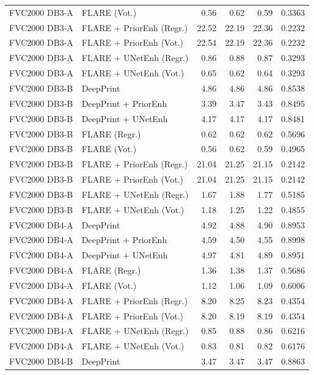 {\begin{longtable}{llrrrr}
FVC2000 DB3-A & FLARE (Vot.) & 0.56 & 0.62 & 0.59 & 0.3363 \\
FVC2000 DB3-A & FLARE + PriorEnh (Regr.) & 22.52 & 22.19 & 22.36 & 0.2232 \\
FVC2000 DB3-A & FLARE + PriorEnh (Vot.) & 22.54 & 22.19 & 22.36 & 0.2232 \\
FVC2000 DB3-A & FLARE + UNetEnh (Regr.) & 0.86 & 0.88 & 0.87 & 0.3293 \\
FVC2000 DB3-A & FLARE + UNetEnh (Vot.) & 0.65 & 0.62 & 0.64 & 0.3293 \\
\midrule
FVC2000 DB3-B & DeepPrint & 4.86 & 4.86 & 4.86 & 0.8538 \\
FVC2000 DB3-B & DeepPrint + PriorEnh & 3.39 & 3.47 & 3.43 & 0.8495 \\
FVC2000 DB3-B & DeepPrint + UNetEnh & 4.17 & 4.17 & 4.17 & 0.8481 \\
FVC2000 DB3-B & FLARE (Regr.) & 0.62 & 0.62 & 0.62 & 0.5696 \\
FVC2000 DB3-B & FLARE (Vot.) & 0.56 & 0.62 & 0.59 & 0.4965 \\
FVC2000 DB3-B & FLARE + PriorEnh (Regr.) & 21.04 & 21.25 & 21.15 & 0.2142 \\
FVC2000 DB3-B & FLARE + PriorEnh (Vot.) & 21.04 & 21.25 & 21.15 & 0.2142 \\
FVC2000 DB3-B & FLARE + UNetEnh (Regr.) & 1.67 & 1.88 & 1.77 & 0.5185 \\
FVC2000 DB3-B & FLARE + UNetEnh (Vot.) & 1.18 & 1.25 & 1.22 & 0.4855 \\
\midrule
FVC2000 DB4-A & DeepPrint & 4.92 & 4.88 & 4.90 & 0.8953 \\
FVC2000 DB4-A & DeepPrint + PriorEnh & 4.59 & 4.50 & 4.55 & 0.8998 \\
FVC2000 DB4-A & DeepPrint + UNetEnh & 4.97 & 4.81 & 4.89 & 0.8951 \\
FVC2000 DB4-A & FLARE (Regr.) & 1.36 & 1.38 & 1.37 & 0.5686 \\
FVC2000 DB4-A & FLARE (Vot.) & 1.12 & 1.06 & 1.09 & 0.6006 \\
FVC2000 DB4-A & FLARE + PriorEnh (Regr.) & 8.20 & 8.25 & 8.23 & 0.4354 \\
FVC2000 DB4-A & FLARE + PriorEnh (Vot.) & 8.20 & 8.19 & 8.19 & 0.4354 \\
FVC2000 DB4-A & FLARE + UNetEnh (Regr.) & 0.85 & 0.88 & 0.86 & 0.6216 \\
FVC2000 DB4-A & FLARE + UNetEnh (Vot.) & 0.83 & 0.81 & 0.82 & 0.6176 \\
\midrule
FVC2000 DB4-B & DeepPrint & 3.47 & 3.47 & 3.47 & 0.8863 \\

\end{longtable}}
